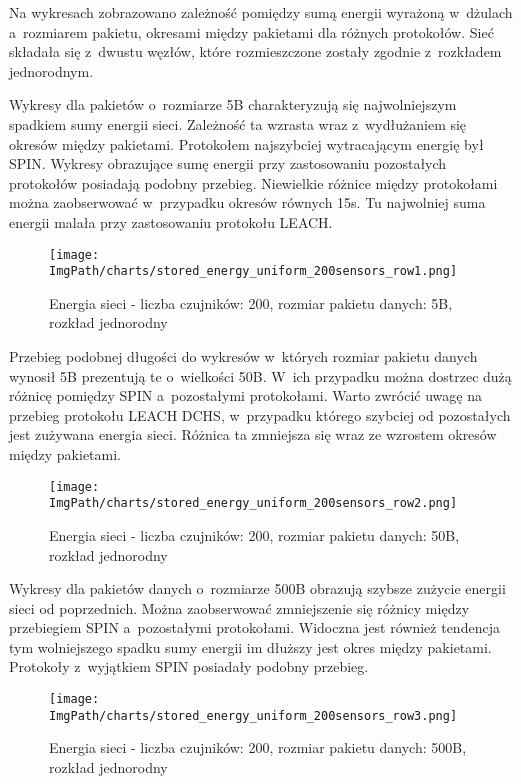 Na wykresach zobrazowano zależność pomiędzy sumą energii wyrażoną w~dżulach a~rozmiarem pakietu, okresami między pakietami dla różnych protokołów. Sieć składała się z~dwustu węzłów, które rozmieszczone zostały zgodnie z~rozkładem jednorodnym.

Wykresy dla pakietów o~rozmiarze 5B charakteryzują się najwolniejszym spadkiem sumy energii sieci. Zależność ta wzrasta wraz z~wydłużaniem się okresów między pakietami. Protokołem najszybciej wytracającym energię był SPIN. Wykresy obrazujące sumę energii przy zastosowaniu pozostałych protokołów posiadają podobny przebieg. Niewielkie różnice między protokołami można zaobserwować w~przypadku okresów równych 15s. Tu najwolniej suma energii malała przy zastosowaniu protokołu LEACH.

\begin{figure}[H]
	\begin{center}
		\texttt{[image: \\ImgPath/charts/stored\_energy\_uniform\_200sensors\_row1.png]}
	\end{center}
	\caption{Energia sieci - liczba czujników: 200, rozmiar pakietu danych: 5B, rozkład jednorodny}
\end{figure}

Przebieg podobnej długości do wykresów w~których rozmiar pakietu danych wynosił 5B prezentują te o~wielkości 50B. W~ich przypadku można dostrzec dużą różnicę pomiędzy SPIN a~pozostałymi protokołami.  Warto zwrócić uwagę na przebieg protokołu LEACH DCHS, w~przypadku którego szybciej od pozostałych jest zużywana energia sieci. Różnica ta zmniejsza się wraz ze wzrostem okresów między pakietami. 

\begin{figure}[H]
	\begin{center}
		\texttt{[image: \\ImgPath/charts/stored\_energy\_uniform\_200sensors\_row2.png]}
	\end{center}
	\caption{Energia sieci - liczba czujników: 200, rozmiar pakietu danych: 50B, rozkład jednorodny}
\end{figure}

Wykresy dla pakietów danych o~rozmiarze 500B obrazują szybsze zużycie energii sieci od poprzednich.  Można zaobserwować zmniejszenie się różnicy między przebiegiem SPIN a~pozostałymi protokołami. Widoczna jest również tendencja tym wolniejszego spadku sumy energii im dłuższy jest okres między pakietami. Protokoły z~wyjątkiem SPIN  posiadały podobny przebieg.

\begin{figure}[H]
	\begin{center}
		\texttt{[image: \\ImgPath/charts/stored\_energy\_uniform\_200sensors\_row3.png]}
	\end{center}
	\caption{Energia sieci - liczba czujników: 200, rozmiar pakietu danych: 500B, rozkład jednorodny}
\end{figure}

